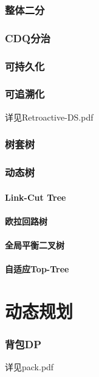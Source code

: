 \documentclass[12pt,a4paper]{article}
\begin{document}
\newpage
\section{整体二分}

\newpage
\section{CDQ分治}

\newpage
\section{可持久化}

\newpage
\section{可追溯化}
详见Retroactive-DS.pdf

\newpage
\section{树套树}

\newpage
\section{动态树}
\subsection{Link-Cut Tree}
\subsection{欧拉回路树}
\subsection{全局平衡二叉树}
\subsection{自适应Top-Tree}

\newpage
\part{动态规划}
\section{背包DP} 
详见pack.pdf
\end{document}
